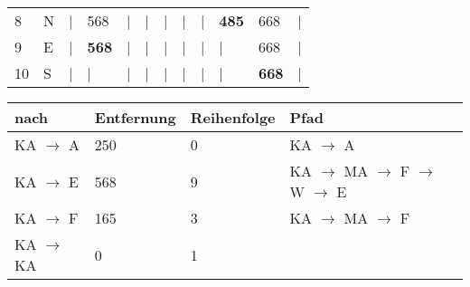 \documentclass{bschlangaul-aufgabe}
\begin{document}
\begin{enumerate}
\begin{bAntwort}
\begin{tabular}{llllllllllll}
8            & N            & |            & 568          & |            & |            & |            & |            & |            & \bf{485}     & 668          & |            \\
9            & E            & |            & \bf{568}     & |            & |            & |            & |            & |            & |            & 668          & |            \\
10           & S            & |            & |            & |            & |            & |            & |            & |            & |            & \bf{668}     & |            \\
\end{tabular}

\noindent
\begin{tabular}{llll}
\bf{nach}                                                                           & \bf{Entfernung}                                                                     & \bf{Reihenfolge}                                                                    & \bf{Pfad}                                                                           \\
\hline
KA  $\rightarrow$  A                                                                & 250                                                                                 & 0                                                                                   & KA $\rightarrow$ A                                                                  \\
KA  $\rightarrow$  E                                                                & 568                                                                                 & 9                                                                                   & KA $\rightarrow$ MA $\rightarrow$ F $\rightarrow$ W $\rightarrow$ E                 \\
KA  $\rightarrow$  F                                                                & 165                                                                                 & 3                                                                                   & KA $\rightarrow$ MA $\rightarrow$ F                                                 \\
KA  $\rightarrow$  KA                                                               & 0                                                                                   & 1                                                                                   &                                                                                     \\

\end{tabular}
\end{bAntwort}
\end{enumerate}
\end{document}
